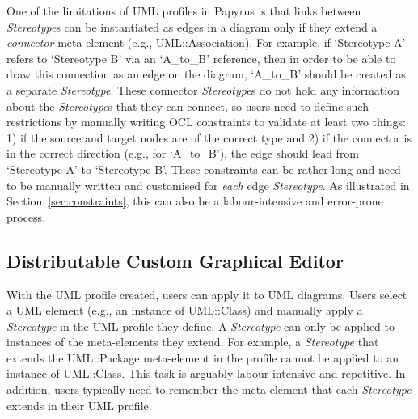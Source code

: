 One of the limitations of UML profiles in Papyrus is that links between \textit{Stereotype}s can be instantiated as edges in a diagram only if they extend a \textit{connector} meta-element (e.g., UML::Association).  
For example, if `Stereotype A' refers to `Stereotype B' via an `A\_to\_B' reference, then in order to be able to draw this connection as an edge on the diagram, `A\_to\_B' should be created as a separate \textit{Stereotype}. 
These connector \textit{Stereotype}s do not hold any information about the \textit{Stereotype}s that they can connect, so users need to define such restrictions by manually writing OCL constraints to validate at least two things: 1) if the source and target nodes are of the correct type and 2) if the connector is in the correct direction (e.g., for `A\_to\_B'), the edge should lead from `Stereotype A' to `Stereotype B'. 
These constraints can be rather long and need to be manually written and customised for \textit{each} edge \textit{Stereotype}. 
As illustrated in Section~\ref{sec:constraints}, this can also be a labour-intensive and error-prone process.

\subsection{Distributable Custom Graphical Editor}
With the UML profile created, users can apply it to UML diagrams. 
Users select a UML element (e.g., an instance of UML::Class) and manually apply a \textit{Stereotype} in the UML profile they define. 
A \textit{Stereotype} can only be applied to instances of the meta-elements they extend.
For example, a \textit{Stereotype} that extends the UML::Package meta-element in the profile cannot be applied to an instance of UML::Class. 
This task is arguably labour-intensive and repetitive. 
In addition, users typically need to remember the meta-element that each \textit{Stereotype} extends in their UML profile. 

